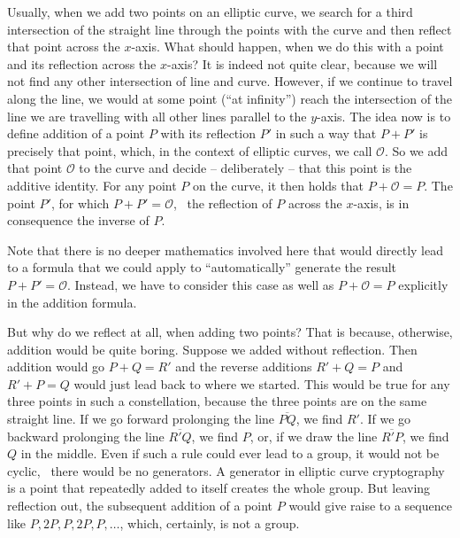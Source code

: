 \documentclass[tikz]{scrreprt}
\begin{document}
Usually, when we add two points on an elliptic curve,
we search for a third intersection of the straight line 
through the points with the curve 
and then reflect that point across
the $x$-axis. What should happen,
when we do this with a point and its reflection
across the $x$-axis? It is indeed not quite clear,
because we will not find any other intersection of line
and curve. However, if we continue to travel
along the line, we would at some point (``at infinity'')
reach the intersection of the line we are travelling
with all other lines parallel to the $y$-axis.
The idea now is to define addition of a point $P$
with its reflection $P'$ in such a way that
$P + P'$ is precisely that point, which,
in the context of elliptic curves, we call $\mathcal{O}$.
So we add that point $\mathcal{O}$ to the curve
and decide -- deliberately -- that this point is
the additive identity. For any point $P$ on the curve,
it then holds that $P + \mathcal{O} = P$.
The point $P'$, for which $P + P' = \mathcal{O}$,
\ie\ the reflection of $P$ across the $x$-axis,
is in consequence the inverse of $P$.

Note that there is no deeper mathematics involved here
that would directly lead to a formula that we could apply
to ``automatically'' generate the result
$P + P' = \mathcal{O}$. Instead, we have
to consider this case as well as $P + \mathcal{O} = P$
explicitly in the addition formula.

But why do we reflect at all, when adding two points?
That is because, otherwise, addition would
be quite boring. Suppose we added without reflection.
Then addition would go $P + Q = R'$ and the 
reverse additions $R' + Q = P$ and
$R' + P = Q$ would just lead back to where we started.
This would be true for any three points 
in such a constellation, because the three points
are on the same straight line. If we go forward prolonging
the line $\overline{PQ}$, we find $R'$. If we go backward
prolonging the line $\overline{R'Q}$, we find $P$, or,
if we draw the line $\overline{R'P}$, we find $Q$ in the middle.
Even if such a rule
could ever lead to a group, it would not be cyclic, \ie\
there would be no generators.
A generator in elliptic curve cryptography is a point
that repeatedly added to itself creates the whole group.
But leaving reflection out, the subsequent addition of
a point $P$ would give raise to a sequence like
$P,2P,P,2P,P,\dots$, which, certainly, is not a group.
\end{document}
